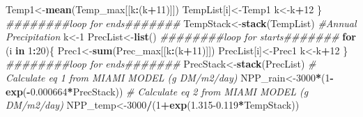 \documentclass[
  10pt,
  b5paper,
]{book}
\newenvironment{Shaded}{\begin{snugshade}}{\end{snugshade}}
\newcommand{\CommentTok}[1]{\textcolor[rgb]{0.56,0.35,0.01}{\textit{#1}}}
\newcommand{\ControlFlowTok}[1]{\textcolor[rgb]{0.13,0.29,0.53}{\textbf{#1}}}
\newcommand{\DecValTok}[1]{\textcolor[rgb]{0.00,0.00,0.81}{#1}}
\newcommand{\FloatTok}[1]{\textcolor[rgb]{0.00,0.00,0.81}{#1}}
\newcommand{\KeywordTok}[1]{\textcolor[rgb]{0.13,0.29,0.53}{\textbf{#1}}}
\newcommand{\NormalTok}[1]{#1}
\newcommand{\OperatorTok}[1]{\textcolor[rgb]{0.81,0.36,0.00}{\textbf{#1}}}
\begin{document}
\begin{Shaded}
\begin{Highlighting}[]
\NormalTok{Temp1<-}\KeywordTok{mean}\NormalTok{(Temp_max[[k}\OperatorTok{:}\NormalTok{(k}\OperatorTok{+}\DecValTok{11}\NormalTok{)]])}
\NormalTok{TempList[i]<-Temp1}
\NormalTok{k<-k}\OperatorTok{+}\DecValTok{12}
\NormalTok{\}}
\CommentTok{########loop for ends#######}
\NormalTok{TempStack<-}\KeywordTok{stack}\NormalTok{(TempList)}
\CommentTok{#Annual Precipitation}
\NormalTok{k<-}\DecValTok{1}
\NormalTok{PrecList<-}\KeywordTok{list}\NormalTok{()}
\CommentTok{########loop for starts#######}
\ControlFlowTok{for}\NormalTok{ (i }\ControlFlowTok{in} \DecValTok{1}\OperatorTok{:}\DecValTok{20}\NormalTok{)\{}
\NormalTok{Prec1<-}\KeywordTok{sum}\NormalTok{(Prec_max[[k}\OperatorTok{:}\NormalTok{(k}\OperatorTok{+}\DecValTok{11}\NormalTok{)]])}
\NormalTok{PrecList[i]<-Prec1}
\NormalTok{k<-k}\OperatorTok{+}\DecValTok{12}
\NormalTok{\}}
\CommentTok{########loop for ends#######}
\NormalTok{PrecStack<-}\KeywordTok{stack}\NormalTok{(PrecList)}
\CommentTok{# Calculate eq 1 from MIAMI MODEL (g DM/m2/day)}
\NormalTok{NPP_rain<-}\DecValTok{3000}\OperatorTok{*}\NormalTok{(}\DecValTok{1}\OperatorTok{-}\KeywordTok{exp}\NormalTok{(}\OperatorTok{-}\FloatTok{0.000664}\OperatorTok{*}\NormalTok{PrecStack))}
\CommentTok{# Calculate eq 2 from MIAMI MODEL (g DM/m2/day)}
\NormalTok{NPP_temp<-}\DecValTok{3000}\OperatorTok{/}\NormalTok{(}\DecValTok{1}\OperatorTok{+}\KeywordTok{exp}\NormalTok{(}\FloatTok{1.315-0.119}\OperatorTok{*}\NormalTok{TempStack))}


\end{Highlighting}
\end{Shaded}
\end{document}
